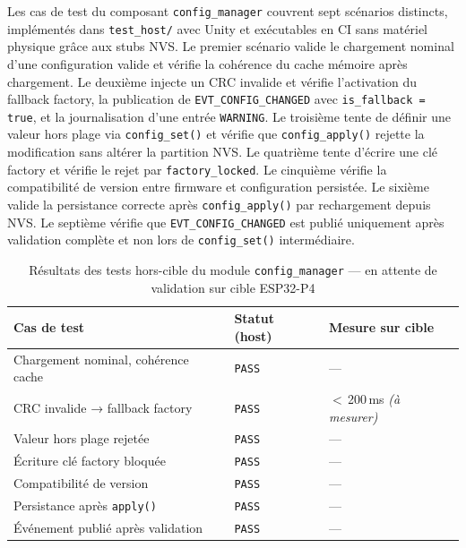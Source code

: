 Les cas de test du composant \texttt{config\_manager} couvrent sept
scénarios distincts, implémentés dans \texttt{test\_host/} avec Unity
et exécutables en CI sans matériel physique grâce aux stubs NVS.
Le premier scénario valide le chargement nominal d'une configuration
valide et vérifie la cohérence du cache mémoire après chargement.
Le deuxième injecte un CRC invalide et vérifie l'activation du fallback
factory, la publication de \texttt{EVT\_CONFIG\_CHANGED} avec
\texttt{is\_fallback = true}, et la journalisation d'une entrée
\texttt{WARNING}. Le troisième tente de définir une valeur hors plage
via \texttt{config\_set()} et vérifie que \texttt{config\_apply()}
rejette la modification sans altérer la partition NVS. Le quatrième
tente d'écrire une clé factory et vérifie le rejet par
\texttt{factory\_locked}. Le cinquième vérifie la compatibilité de
version entre firmware et configuration persistée. Le sixième valide
la persistance correcte après \texttt{config\_apply()} par rechargement
depuis NVS. Le septième vérifie que \texttt{EVT\_CONFIG\_CHANGED}
est publié uniquement après validation complète et non lors de
\texttt{config\_set()} intermédiaire.

\begin{table}[H]
\centering
\renewcommand{\arraystretch}{1.5}
\caption{Résultats des tests hors-cible du module \texttt{config\_manager} — en attente de validation sur cible ESP32-P4}
\label{tab:res_config}
\small
\begin{tabular}{|p{5.5cm}|p{2.2cm}|p{3.8cm}|}
\hline
\rowcolor{gray!20}
\textbf{Cas de test} & \textbf{Statut (host)} & \textbf{Mesure sur cible} \\
\hline
Chargement nominal, cohérence cache  & \texttt{PASS} & — \\
\hline
CRC invalide → fallback factory       & \texttt{PASS} & $<$\,200\,ms \textit{(à mesurer)} \\
\hline
Valeur hors plage rejetée             & \texttt{PASS} & — \\
\hline
Écriture clé factory bloquée          & \texttt{PASS} & — \\
\hline
Compatibilité de version              & \texttt{PASS} & — \\
\hline
Persistance après \texttt{apply()}    & \texttt{PASS} & — \\
\hline
Événement publié après validation     & \texttt{PASS} & — \\
\hline
\end{tabular}
\end{table}

